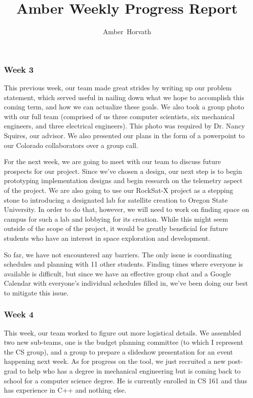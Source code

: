 \documentclass[letterpaper,10pt]{article}
\title{Amber Weekly Progress Report}
\author{Amber~Horvath}
\begin{document}
\maketitle

\subsubsection{Week 3}
This previous week, our team made great strides by writing up our problem statement, which served useful in nailing
 down what we hope to accomplish this coming term, and how we can actualize these goals. We also took a group photo 
 with our full team (comprised of us three computer scientists, six mechanical engineers, and three electrical 
 engineers). This photo was required by Dr. Nancy Squires, our advisor. We also presented our plans in the form of a 
 powerpoint to our Colorado collaborators over a group call.

For the next week, we are going to meet with our team to discuss future prospects for our project. Since we've chosen 
a design, our next step is to begin prototyping implementation designs and begin research on the telemetry aspect of 
the project. We are also going to use our RockSat-X project as a stepping stone to introducing a designated lab for 
satellite creation to Oregon State University. In order to do that, however, we will need to work on finding space on
 campus for such a lab and lobbying for its creation. While this might seem outside of the scope of the project, it 
 would be greatly beneficial for future students who have an interest in space exploration and development.

So far, we have not encountered any barriers. The only issue is coordinating schedules and planning with 11 other 
students. Finding times where everyone is available is difficult, but since we have an effective group chat and a
 Google Calendar with everyone's individual schedules filled in, we've been doing our best to mitigate this issue.

\subsubsection{Week 4}
This week, our team worked to figure out more logistical details. We assembled two new sub-teams, one is the budget 
planning committee (to which I represent the CS group), and a group to prepare a slideshow presentation for an event 
happening next week. As for progress on the tool, we just recruited a new post-grad to help who has a degree in 
mechanical engineering but is coming back to school for a computer science degree. He is currently enrolled in CS 161 
and thus has experience in C++ and nothing else. 
\end{document}
